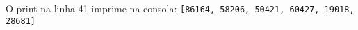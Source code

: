 \documentclass[12pt,varwidth=16cm,border=1pt]{standalone}
\begin{document}
O print na linha 41 imprime na consola:
\newline
\verb+[86164, 58206, 50421, 60427, 19018, 28681]+
\end{document}
